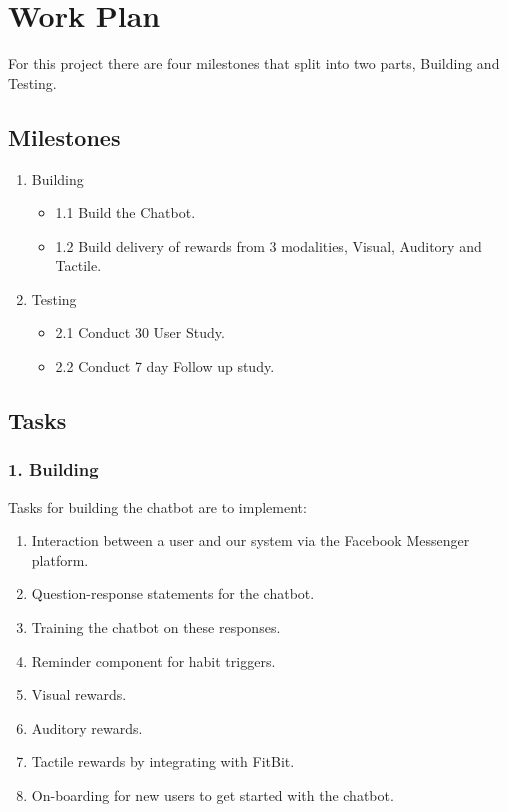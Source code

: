 
\newpage
\section{Work Plan}
For this project there are four milestones that split into two parts, Building and Testing.


\subsection{Milestones}

\begin{enumerate}
  \item Building
  \begin{itemize}
    \item 1.1 Build the Chatbot.
    \item 1.2 Build delivery of rewards from 3 modalities, Visual, Auditory and Tactile.
  \end{itemize}
  \item Testing
  \begin{itemize}
    \item 2.1 Conduct 30 User Study.
    \item 2.2 Conduct 7 day Follow up study.
  \end{itemize}
\end{enumerate}

\subsection{Tasks}

\subsubsection*{1. Building}
Tasks for building the chatbot are to implement:

\begin{enumerate}
  \item Interaction between a user and our system via the Facebook Messenger platform.
  \item Question-response statements for the chatbot.
  \item Training the chatbot on these responses.
  \item Reminder component for habit triggers.
  \item Visual rewards.
  \item Auditory rewards.
  \item Tactile rewards by integrating with FitBit.
  \item On-boarding for new users to get started with the chatbot.
\end{enumerate}

